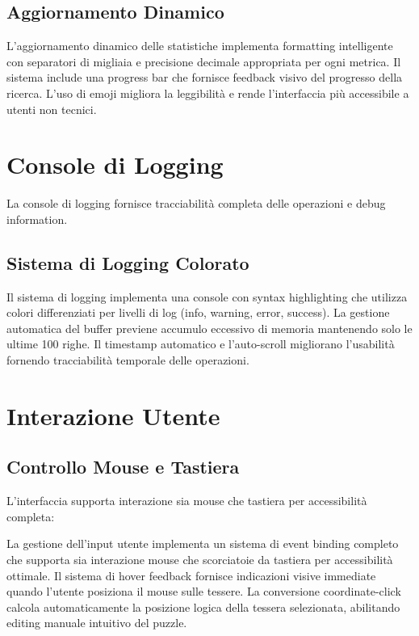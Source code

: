\documentclass[12pt,a4paper]{report}
\theoremstyle{definition}
\begin{document}
\subsection{Aggiornamento Dinamico}

L'aggiornamento dinamico delle statistiche implementa formatting intelligente con separatori di migliaia e precisione decimale appropriata per ogni metrica. Il sistema include una progress bar che fornisce feedback visivo del progresso della ricerca. L'uso di emoji migliora la leggibilità e rende l'interfaccia più accessibile a utenti non tecnici.

\section{Console di Logging}

La console di logging fornisce tracciabilità completa delle operazioni e debug information.

\subsection{Sistema di Logging Colorato}

Il sistema di logging implementa una console con syntax highlighting che utilizza colori differenziati per livelli di log (info, warning, error, success). La gestione automatica del buffer previene accumulo eccessivo di memoria mantenendo solo le ultime 100 righe. Il timestamp automatico e l'auto-scroll migliorano l'usabilità fornendo tracciabilità temporale delle operazioni.

\section{Interazione Utente}

\subsection{Controllo Mouse e Tastiera}

L'interfaccia supporta interazione sia mouse che tastiera per accessibilità completa:

La gestione dell'input utente implementa un sistema di event binding completo che supporta sia interazione mouse che scorciatoie da tastiera per accessibilità ottimale. Il sistema di hover feedback fornisce indicazioni visive immediate quando l'utente posiziona il mouse sulle tessere. La conversione coordinate-click calcola automaticamente la posizione logica della tessera selezionata, abilitando editing manuale intuitivo del puzzle.
\end{document}

